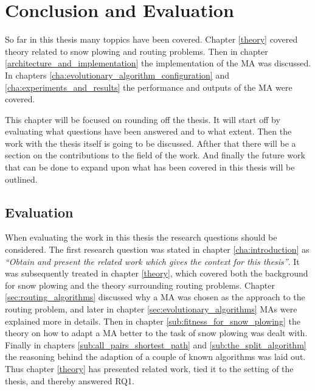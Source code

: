 \chapter{Conclusion and Evaluation}

So far in this thesis many toppics have been covered. Chapter \ref{theory} covered theory related to snow plowing and routing problems. Then in chapter \ref{architecture_and_implementation} the implementation of the MA was discussed. In chapters \ref{cha:evolutionary_algorithm_configuration} and \ref{cha:experiments_and_results} the performance and outputs of the MA were covered.

This chapter will be focused on rounding off the thesis. It will start off by evaluating what questions have been answered and to what extent. Then the work with the thesis itself is going to be discussed. Afther that there will be a section on the contributions to the field of the work. And finally the future work that can be done to expand upon what has been covered in this thesis will be outlined.

\section{Evaluation}



When evaluating the work in this thesis the research questions should be considered. The first research question was stated in chapter \ref{cha:introduction} as \emph{\enquote{Obtain and present the related work which gives the context for this thesis}}. It was subsequently treated in chapter \ref{theory}, which covered both the background for snow plowing and the theory surrounding routing problems. Chapter \ref{sec:routing_algorithms} discussed why a MA was chosen as the approach to the routing problem, and later in chapter \ref{sec:evolutionary_algorithms} MAs were explained more in details. Then in chapter \ref{sub:fitness_for_snow_plowing} the theory on how to adapt a MA better to the task of snow plowing was dealt with. Finally in chapters \ref{sub:all_pairs_shortest_path} and \ref{sub:the_split_algorithm} the reasoning behind the adaption of a couple of known algorithms was laid out. Thus chapter \ref{theory} has presented related work, tied it to the setting of the thesis, and thereby answered RQ1.

